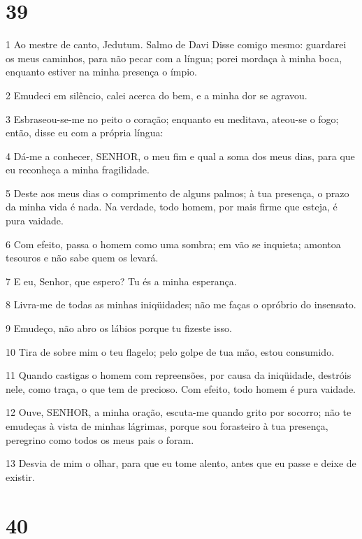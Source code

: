 \chapter{39}

\par 1 Ao mestre de canto, Jedutum. Salmo de Davi Disse comigo mesmo: guardarei os meus caminhos, para não pecar com a língua; porei mordaça à minha boca, enquanto estiver na minha presença o ímpio.
\par 2 Emudeci em silêncio, calei acerca do bem, e a minha dor se agravou.
\par 3 Esbraseou-se-me no peito o coração; enquanto eu meditava, ateou-se o fogo; então, disse eu com a própria língua:
\par 4 Dá-me a conhecer, SENHOR, o meu fim e qual a soma dos meus dias, para que eu reconheça a minha fragilidade.
\par 5 Deste aos meus dias o comprimento de alguns palmos; à tua presença, o prazo da minha vida é nada. Na verdade, todo homem, por mais firme que esteja, é pura vaidade.
\par 6 Com efeito, passa o homem como uma sombra; em vão se inquieta; amontoa tesouros e não sabe quem os levará.
\par 7 E eu, Senhor, que espero? Tu és a minha esperança.
\par 8 Livra-me de todas as minhas iniqüidades; não me faças o opróbrio do insensato.
\par 9 Emudeço, não abro os lábios porque tu fizeste isso.
\par 10 Tira de sobre mim o teu flagelo; pelo golpe de tua mão, estou consumido.
\par 11 Quando castigas o homem com repreensões, por causa da iniqüidade, destróis nele, como traça, o que tem de precioso. Com efeito, todo homem é pura vaidade.
\par 12 Ouve, SENHOR, a minha oração, escuta-me quando grito por socorro; não te emudeças à vista de minhas lágrimas, porque sou forasteiro à tua presença, peregrino como todos os meus pais o foram.
\par 13 Desvia de mim o olhar, para que eu tome alento, antes que eu passe e deixe de existir.

\chapter{40}

